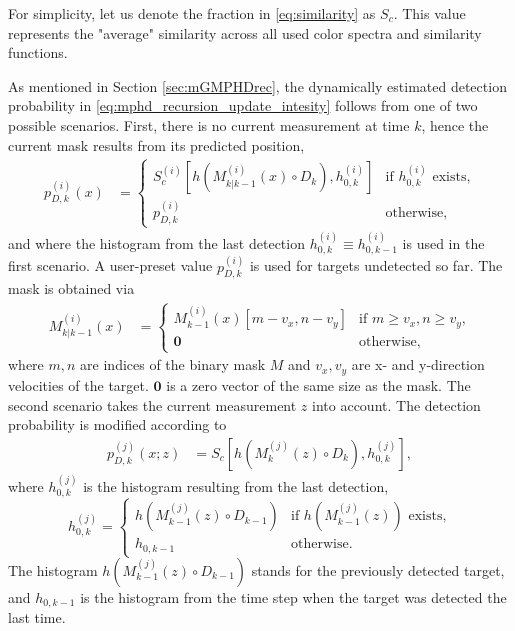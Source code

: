 For simplicity, let us denote the fraction in \eqref{eq:similarity} as $S_c$. This value represents the "average"
similarity across all used color spectra and similarity functions.

As mentioned in Section \ref{sec:mGMPHDrec}, the dynamically estimated detection probability in \eqref{eq:mphd_recursion_update_intesity} follows from one of two possible scenarios. First, there is no current measurement at
time $k$, hence the current mask results from its predicted position,
\begin{align}
  \label{eq:mphd_recursion_update_intesity_misdetect_pd}
  p_{D,k}^{(i)}(x) &=
  \begin{cases}
     S_c^{(i)}\left[h(M_{k|k-1}^{(i)}(x) \circ D_k), h_{0,k}^{(i)}\right] &\text{if $h_{0,k}^{(i)}$ exists,} \\
     p_{D,k}^{(i)} \quad& \text{otherwise,}
  \end{cases}
\end{align}
and where the histogram from the last detection $h_{0,k}^{(i)} \equiv  h_{0,k-1}^{(i)}$ is used in the first scenario. A user-preset value $p_{D,k}^{(i)}$ is used for targets undetected so far. The mask is obtained via
\begin{align}
  \label{eq:mphd_recursion_update_intesity_misdetect_M_shifted}
  M_{k|k-1}^{(i)}(x) &=
  \begin{cases}
    \!M_{k-1}^{(i)}(x)[m-v_x, n-v_y] &\text{if $m\geq v_x, n\geq v_y$,} \\
    \mathbf{0} \quad &\text{otherwise,}
  \end{cases}
\end{align}
where $m, n$ are indices of the binary mask $M$ and $v_x, v_y$ are x- and y-direction velocities of the target. $\mathbf{0}$ is a zero vector of the same size as the mask. The second scenario takes the current measurement $z$ into account. The detection probability is modified according to
\begin{align}
  p_{D,k}^{(j)}(x;z) &= S_c\left[h(M_{k}^{(j)}(z) \circ D_k), h_{0,k}^{(j)}\right], \label{eq:mphd_recursion_update_intesity_misdetect_z_pd}
\end{align}
where $h_{0,k}^{(j)}$ is the histogram resulting from the last detection,
\begin{equation}
  \label{eq:mphd_recursion_update_intesity_misdetect_Hist}
  h_{0,k}^{(j)} =
  \begin{cases}
    h(M_{k-1}^{(j)}(z) \circ D_{k-1}) &\text{if } h(M_{k-1}^{(j)}(z)) \text{ exists,} \\
    h_{0,k-1} &\text{otherwise.}
  \end{cases}
\end{equation}
The histogram $h(M_{k-1}^{(j)}(z) \circ D_{k-1})$ stands for the previously detected target, and $h_{0,k-1}$ is the histogram from the time step when the target was detected the last time.



